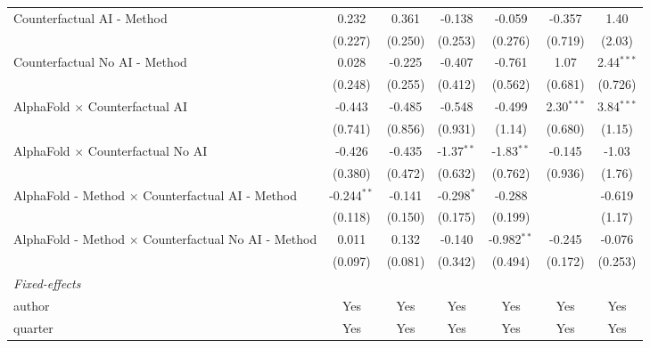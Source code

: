 \begin{tabular}{lcccccc}
   Counterfactual AI - Method                                 & 0.232         & 0.361   & -0.138        & -0.059        & -0.357       & 1.40\\   
                                                              & (0.227)       & (0.250) & (0.253)       & (0.276)       & (0.719)      & (2.03)\\   
   Counterfactual No AI - Method                              & 0.028         & -0.225  & -0.407        & -0.761        & 1.07         & 2.44$^{***}$\\   
                                                              & (0.248)       & (0.255) & (0.412)       & (0.562)       & (0.681)      & (0.726)\\   
   AlphaFold $\times$ Counterfactual AI                       & -0.443        & -0.485  & -0.548        & -0.499        & 2.30$^{***}$ & 3.84$^{***}$\\   
                                                              & (0.741)       & (0.856) & (0.931)       & (1.14)        & (0.680)      & (1.15)\\   
   AlphaFold $\times$ Counterfactual No AI                    & -0.426        & -0.435  & -1.37$^{**}$  & -1.83$^{**}$  & -0.145       & -1.03\\   
                                                              & (0.380)       & (0.472) & (0.632)       & (0.762)       & (0.936)      & (1.76)\\   
   AlphaFold - Method $\times$ Counterfactual AI - Method     & -0.244$^{**}$ & -0.141  & -0.298$^{*}$  & -0.288        &              & -0.619\\   
                                                              & (0.118)       & (0.150) & (0.175)       & (0.199)       &              & (1.17)\\   
   AlphaFold - Method $\times$ Counterfactual No AI - Method  & 0.011         & 0.132   & -0.140        & -0.982$^{**}$ & -0.245       & -0.076\\   
                                                              & (0.097)       & (0.081) & (0.342)       & (0.494)       & (0.172)      & (0.253)\\   
   \midrule
   \emph{Fixed-effects}\\
   author                                                     & Yes           & Yes     & Yes           & Yes           & Yes          & Yes\\  
   quarter                                                    & Yes           & Yes     & Yes           & Yes           & Yes          & Yes\\  

\end{tabular}
